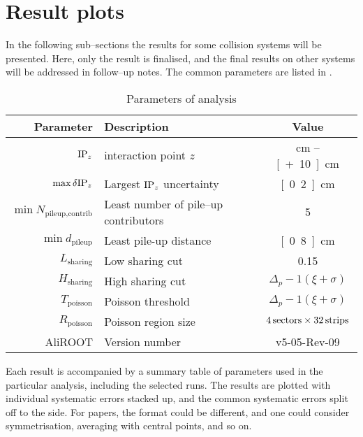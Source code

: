 \section{Result plots} 
\label{sec:results}

In the following sub--sections the \ndndeta{} results for some
collision systems will be presented.  Here, only the \PbPbCol{} result
is finalised, and the final results on other systems will be addressed
in follow--up notes.  The common parameters are listed in
.

\begin{table}[h!tbp]
  \caption{Parameters of analysis}
  \label{tab:common:params}
  \centering
  \begin{tabular}[t]{|rlc|}
    \hline
    \headColor{} 
    \textbf{Parameter}
    & \textbf{Description}
    & \textbf{Value}\\
    \hline 
    $\IPz$ 
    & interaction point $z$ 
    & \unit[-10]{cm} -- \unit[+10]{cm}\\
    \altRowColor{}
    $\max{\delta\IPz}$ 
    & Largest $\IPz$ uncertainty 
    & \unit[0.2]{cm}\\
    $\min{N_{\text{pileup,contrib}}}$ 
    & Least number of pile--up contributors 
    & 5\\
    \altRowColor{}
    $\min{d_{\text{pileup}}}$ 
    & Least pile-up distance 
    & \unit[0.8]{cm}\\
    \hline 
    $L_{\text{sharing}}$ 
    & Low sharing cut 
    & 0.15\\
    \altRowColor{}
    $H_{\text{sharing}}$ 
    & High sharing cut 
    & $\Delta_p-1(\xi+\sigma)$ \\
    $T_{\text{poisson}}$ 
    & Poisson threshold 
    & $\Delta_p-1(\xi+\sigma)$ \\
    \altRowColor{}
    $R_{\text{poisson}}$ 
    & Poisson region size 
    & $\unit[4]{sectors} \times \unit[32]{strips}$\\
    \hline 
    \textsf{AliROOT} 
    & Version number 
    & v5-05-Rev-09\\
    \hline
  \end{tabular}
\end{table}


Each result is accompanied by a summary table of parameters used in
the particular analysis, including the selected runs.  The results are
plotted with individual systematic errors stacked up, and the common
systematic errors split off to the side.  For papers, the format could
be different, and one could consider symmetrisation, averaging with
central points,  and so on. 



